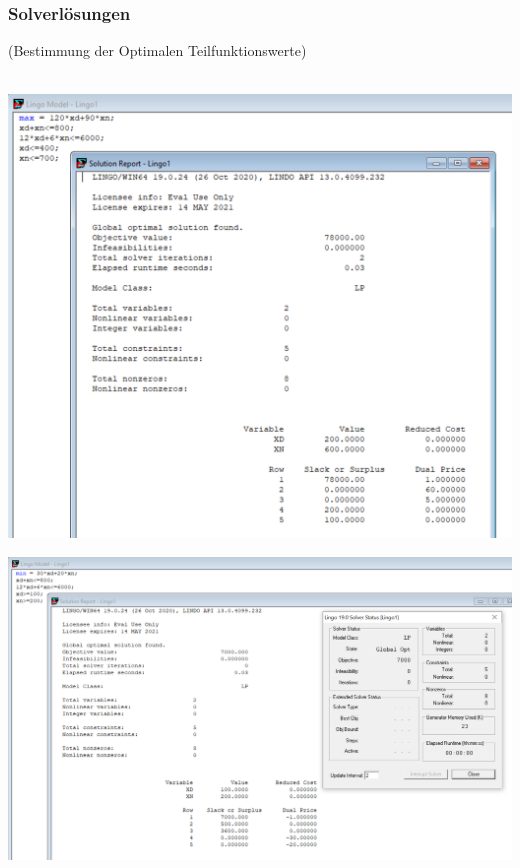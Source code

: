 \documentclass[a4paper,11pt]{article}
\begin{document}
\vspace{4mm}

\subsubsection*{Solverlösungen}
(Bestimmung der Optimalen Teilfunktionswerte) \\~\\

\begin{minipage}{1\textwidth}
  \centering
  \begin{minipage}{.5\textwidth}
    \centering
    \includegraphics[width=1\linewidth]{src/blatt_7_aufgabe_2_solverloesung_1.png}
  \end{minipage}%
  \begin{minipage}{.5\textwidth}
    \centering
    \includegraphics[width=1\linewidth]{src/blatt_7_aufgabe_2_solverloesung_2.png}
  \end{minipage}
\end{minipage}
\end{document}
